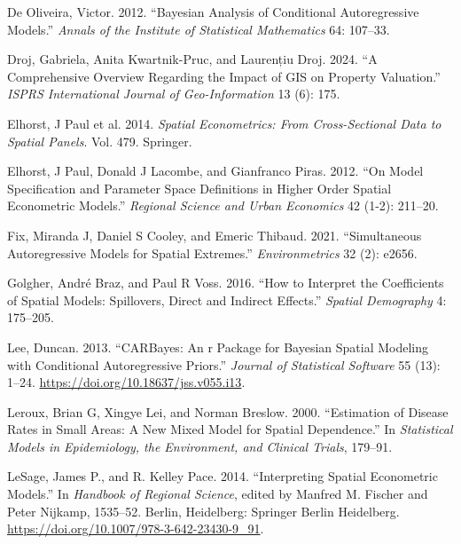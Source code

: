 \documentclass[
  default,
]{sn-jnl}
\newlength{\cslhangindent}
\newenvironment{CSLReferences}[2] %
 {\begin{list}{}{%
  \setlength{\itemindent}{0pt}
  \setlength{\leftmargin}{0pt}
  \setlength{\parsep}{0pt}
  \ifodd #1
   \setlength{\leftmargin}{\cslhangindent}
   \setlength{\itemindent}{-1\cslhangindent}
  \fi
  \setlength{\itemsep}{#2\baselineskip}}}
 {\end{list}}
\begin{document}
\begin{CSLReferences}{1}{0}
De Oliveira, Victor. 2012. {``Bayesian Analysis of Conditional
Autoregressive Models.''} \emph{Annals of the Institute of Statistical
Mathematics} 64: 107--33.

Droj, Gabriela, Anita Kwartnik-Pruc, and Laurențiu Droj. 2024. {``A
Comprehensive Overview Regarding the Impact of GIS on Property
Valuation.''} \emph{ISPRS International Journal of Geo-Information} 13
(6): 175.

Elhorst, J Paul et al. 2014. \emph{Spatial Econometrics: From
Cross-Sectional Data to Spatial Panels}. Vol. 479. Springer.

Elhorst, J Paul, Donald J Lacombe, and Gianfranco Piras. 2012. {``On
Model Specification and Parameter Space Definitions in Higher Order
Spatial Econometric Models.''} \emph{Regional Science and Urban
Economics} 42 (1-2): 211--20.

Fix, Miranda J, Daniel S Cooley, and Emeric Thibaud. 2021.
{``Simultaneous Autoregressive Models for Spatial Extremes.''}
\emph{Environmetrics} 32 (2): e2656.

Golgher, André Braz, and Paul R Voss. 2016. {``How to Interpret the
Coefficients of Spatial Models: Spillovers, Direct and Indirect
Effects.''} \emph{Spatial Demography} 4: 175--205.

Lee, Duncan. 2013. {``CARBayes: An r Package for Bayesian Spatial
Modeling with Conditional Autoregressive Priors.''} \emph{Journal of
Statistical Software} 55 (13): 1--24.
\url{https://doi.org/10.18637/jss.v055.i13}.

Leroux, Brian G, Xingye Lei, and Norman Breslow. 2000. {``Estimation of
Disease Rates in Small Areas: A New Mixed Model for Spatial
Dependence.''} In \emph{Statistical Models in Epidemiology, the
Environment, and Clinical Trials}, 179--91.

LeSage, James P., and R. Kelley Pace. 2014. {``Interpreting Spatial
Econometric Models.''} In \emph{Handbook of Regional Science}, edited by
Manfred M. Fischer and Peter Nijkamp, 1535--52. Berlin, Heidelberg:
Springer Berlin Heidelberg.
\url{https://doi.org/10.1007/978-3-642-23430-9_91}.


\end{CSLReferences}
\end{document}
